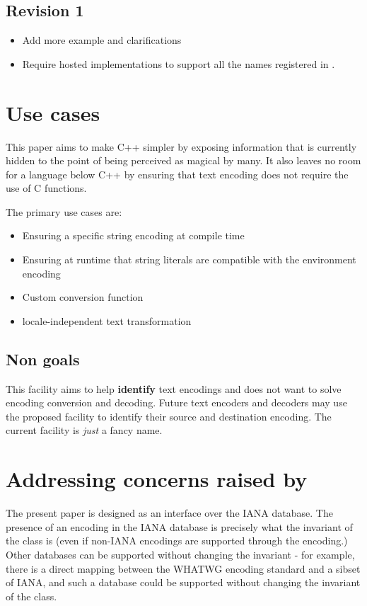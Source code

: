 \documentclass{wg21}
\begin{document}
\subsection*{Revision 1}
\begin{itemize}
    \item Add more example and clarifications
    \item Require hosted implementations to support all the names registered in \cite{ianacharset-mib}.
\end{itemize}

\section{Use cases}

This paper aims to make C++ simpler by exposing information that is currently hidden to the point of
being perceived as magical by many.
It also leaves no room for a language below C++ by ensuring that text encoding does not require the use of C functions.

The primary use cases are:

\begin{itemize}
    \item Ensuring a specific string encoding at compile time
    \item Ensuring at runtime that string literals are compatible with the environment encoding
    \item Custom conversion function
    \item locale-independent text transformation
\end{itemize}

\subsection{Non goals}

This facility aims to help \textbf{identify} text encodings and does not want to solve encoding conversion and decoding.
Future text encoders and decoders may use the proposed facility to identify their source and destination encoding.
The current facility is \emph{just} a fancy name.


\label{P2498-concerns} \section{Addressing concerns raised by  }


The present paper is designed as an interface over the IANA database. The presence of an encoding in the IANA database is precisely what the invariant of the class is (even if non-IANA encodings are supported through the  encoding.)
Other databases can be supported without changing the invariant - for example, there is a direct mapping between the WHATWG encoding standard and a sibset of IANA,
and such a database could be supported without changing the invariant of the class.
\end{document}
